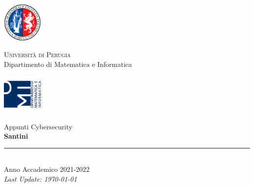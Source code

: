 
\thispagestyle{empty} %

\noindent %
\includegraphics[width=0.15\textwidth]{frontmatter/imgs/logoUniPg.jpg}
\begin{minipage}[b]{0.7\textwidth}
    \centering
    {\Large \textsc{Universit{\`a} di Perugia}}\\
    \vspace{0.4 em}
    {\large Dipartimento di Matematica e Informatica}
    \vspace{0.6 em}
\end{minipage}%
\includegraphics[width=0.15\textwidth]{frontmatter/imgs/logoDMI.jpg}

\vspace{8 em}

\begin{center}
    {\Huge Appunti Cybersecurity}\\
    \vspace{5 em}
    {\Huge \textbf{Santini}}\\

    \vfill

    \rule{380pt}{.4pt}\\
    \vspace{1.2 em}
    \large{Anno Accademico 2021-2022}\\
    \vspace{.9 em}
    \small{\textit{Last Update: \today{}}}
\end{center}

